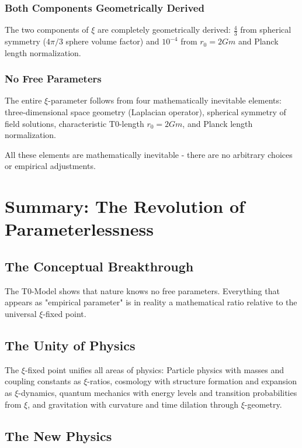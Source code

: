 \documentclass[12pt,a4paper]{report}
\begin{document}
	\subsubsection{Both Components Geometrically Derived}
	
	The two components of $\xi$ are completely geometrically derived: $\frac{4}{3}$ from spherical symmetry ($4\pi/3$ sphere volume factor) and $10^{-4}$ from $r_0 = 2Gm$ and Planck length normalization.
	
	\subsubsection{No Free Parameters}
	
	The entire $\xi$-parameter follows from four mathematically inevitable elements: three-dimensional space geometry (Laplacian operator), spherical symmetry of field solutions, characteristic T0-length $r_0 = 2Gm$, and Planck length normalization.
	
	All these elements are mathematically inevitable - there are no arbitrary choices or empirical adjustments.
	
	\section{Summary: The Revolution of Parameterlessness}
	
	\subsection{The Conceptual Breakthrough}
	
	The T0-Model shows that nature knows no free parameters. Everything that appears as "empirical parameter" is in reality a mathematical ratio relative to the universal $\xi$-fixed point.
	
	\subsection{The Unity of Physics}
	
	The $\xi$-fixed point unifies all areas of physics: Particle physics with masses and coupling constants as $\xi$-ratios, cosmology with structure formation and expansion as $\xi$-dynamics, quantum mechanics with energy levels and transition probabilities from $\xi$, and gravitation with curvature and time dilation through $\xi$-geometry.
	
	\subsection{The New Physics}
	
\end{document}
